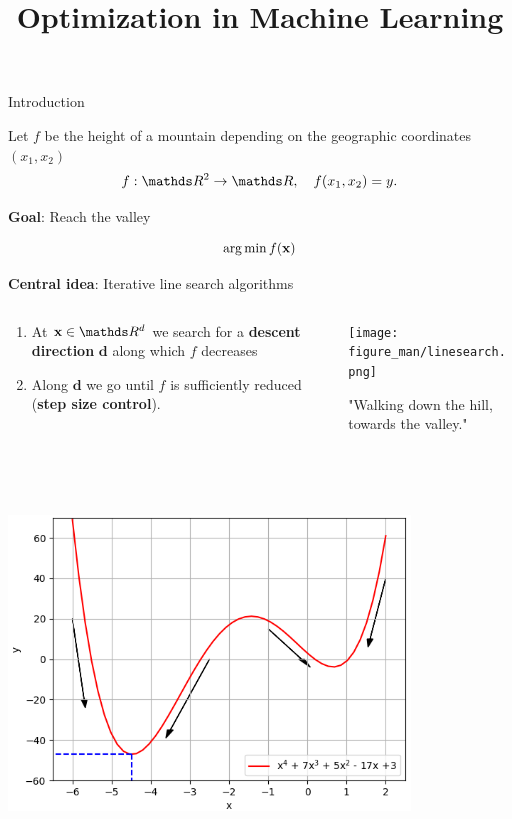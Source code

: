\documentclass[11pt,compress,t,notes=noshow, xcolor=table]{beamer}
\title{Optimization in Machine Learning}
\date{}
\begin{document}
\sloppy

\begin{vbframe}{Introduction}

	Let $f$ be the height of a mountain depending on the geographic coordinates $(x_1, x_2)$
	\vspace*{-0.1cm}
	$$
	f: \R^2 \to \R, \quad f(x_1, x_2) = y.
	$$
	
	\textbf{Goal}: Reach the valley

	$$
	\operatorname{arg\,min} f(\mathbf{x})
	$$
	
	\textbf{Central idea}: Iterative line search algorithms
	\vspace*{-0.15cm}
	\begin{columns}
		\begin{column}{0.58\textwidth}
			\begin{enumerate}
				\item At $\xv \in \R^d$ we search for a \textbf{descent direction} $\mathbf{d}$ along which $f$ decreases
			  	\item Along $\mathbf{d}$ we go until $f$ is sufficiently reduced (\textbf{step size control}).
			\end{enumerate}
		\end{column}
		\begin{column}{0.4\textwidth}
			\begin{center}
			\texttt{[image: figure\_man/linesearch.png]}
			\hspace{2cm} \begin{footnotesize} "Walking down the hill, towards the valley." \end{footnotesize}\\
			\end{center}
		\end{column}
	\end{columns}
	
\framebreak

\begin{center}
$ $ \\
\includegraphics[width=0.8\textwidth]{figure_man/negative_gradients.png}
\end{center}

\end{vbframe}
\end{document}
